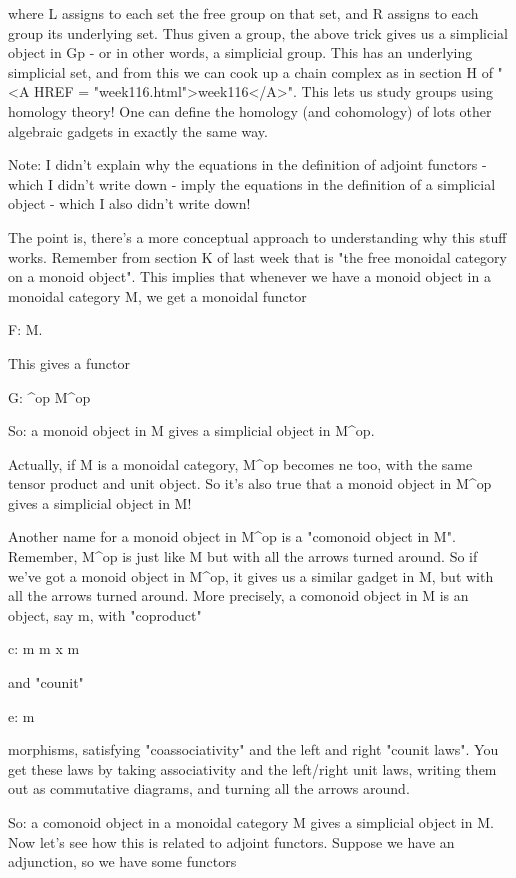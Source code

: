 where L assigns to each set the free group on that set, and R assigns to
each group its underlying set.  Thus given a group, the above trick
gives us a simplicial object in Gp - or in other words, a simplicial
group.  This has an underlying simplicial set, and from this we can cook
up a chain complex as in section H of "<A HREF = "week116.html">week116</A>".  This lets us study
groups using homology theory!  One can define the homology (and
cohomology) of lots other algebraic gadgets in exactly the same way.

Note: I didn't explain why the equations in the definition of adjoint
functors - which I didn't write down - imply the equations in the
definition of a simplicial object - which I also didn't write down!

The point is, there's a more conceptual approach to understanding why
this stuff works.  Remember from section K of last week that \Delta  is
"the free monoidal category on a monoid object".  This implies that
whenever we have a monoid object in a monoidal category M, we get a
monoidal functor

F: \Delta  \to  M.

This gives a functor

G: \Delta ^{op} \to  M^{op}

So: a monoid object in M gives a simplicial object in M^{op}.  

Actually, if M is a monoidal category, M^{op} becomes ne too, with the
same tensor product and unit object.  So it's also true that a monoid
object in M^{op} gives a simplicial object in M!

Another name for a monoid object in M^{op} is a "comonoid object in M".
Remember, M^{op} is just like M but with all the arrows turned around.
So if we've got a monoid object in M^{op}, it gives us a similar gadget
in M, but with all the arrows turned around.  More precisely, a comonoid
object in M is an object, say m, with "coproduct"

c: m \to  m x m

and "counit"

e: m 

morphisms, satisfying "coassociativity" and the left and right "counit
laws".  You get these laws by taking associativity and the left/right
unit laws, writing them out as commutative diagrams, and turning all the
arrows around.

So: a comonoid object in a monoidal category M gives a simplicial object
in M.  Now let's see how this is related to adjoint functors.  Suppose
we have an adjunction, so we have some functors


